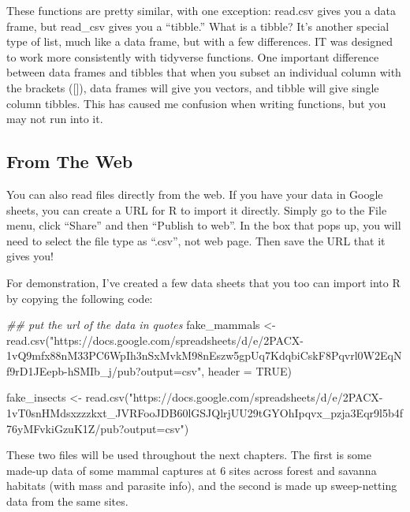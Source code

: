 \documentclass[
  letterpaper,
  DIV=11,
  numbers=noendperiod]{scrreprt}
\newenvironment{Shaded}{\begin{snugshade}}{\end{snugshade}}
\newcommand{\AttributeTok}[1]{\textcolor[rgb]{0.40,0.45,0.13}{#1}}
\newcommand{\ConstantTok}[1]{\textcolor[rgb]{0.56,0.35,0.01}{#1}}
\newcommand{\DocumentationTok}[1]{\textcolor[rgb]{0.37,0.37,0.37}{\textit{#1}}}
\newcommand{\FunctionTok}[1]{\textcolor[rgb]{0.28,0.35,0.67}{#1}}
\newcommand{\NormalTok}[1]{\textcolor[rgb]{0.00,0.23,0.31}{#1}}
\newcommand{\OtherTok}[1]{\textcolor[rgb]{0.00,0.23,0.31}{#1}}
\newcommand{\StringTok}[1]{\textcolor[rgb]{0.13,0.47,0.30}{#1}}
\begin{document}
These functions are pretty similar, with one exception: read.csv gives
you a data frame, but read\_csv gives you a ``tibble.'' What is a
tibble? It's another special type of list, much like a data frame, but
with a few differences. IT was designed to work more consistently with
tidyverse functions. One important difference between data frames and
tibbles that when you subset an individual column with the brackets
({[}{]}), data frames will give you vectors, and tibble will give single
column tibbles. This has caused me confusion when writing functions, but
you may not run into it.

\hypertarget{from-the-web}{%
\subsection{From The Web}\label{from-the-web}}

You can also read files directly from the web. If you have your data in
Google sheets, you can create a URL for R to import it directly. Simply
go to the File menu, click ``Share'' and then ``Publish to web''. In the
box that pops up, you will need to select the file type as ``.csv'', not
web page. Then save the URL that it gives you!

For demonstration, I've created a few data sheets that you too can
import into R by copying the following code:

\begin{Shaded}
\begin{Highlighting}[]
\DocumentationTok{\#\# put the url of the data in quotes}
\NormalTok{fake\_mammals }\OtherTok{\textless{}{-}} \FunctionTok{read.csv}\NormalTok{(}\StringTok{"https://docs.google.com/spreadsheets/d/e/2PACX{-}1vQ9mfx88nM33PC6WpIh3nSxMvkM98nEszw5gpUq7KdqbiCskF8Pqvrl0W2EqNf9rD1JEepb{-}hSMIb\_j/pub?output=csv"}\NormalTok{, }\AttributeTok{header =} \ConstantTok{TRUE}\NormalTok{)}

\NormalTok{fake\_insects }\OtherTok{\textless{}{-}} \FunctionTok{read.csv}\NormalTok{(}\StringTok{"https://docs.google.com/spreadsheets/d/e/2PACX{-}1vT0snHMdsxzzzkxt\_JVRFooJDB60lGSJQlrjUU29tGYOhIpqvx\_pzja3Eqr9l5b4f76yMFvkiGzuK1Z/pub?output=csv"}\NormalTok{)}
\end{Highlighting}
\end{Shaded}

These two files will be used throughout the next chapters. The first is
some made-up data of some mammal captures at 6 sites across forest and
savanna habitats (with mass and parasite info), and the second is made
up sweep-netting data from the same sites.
\end{document}
